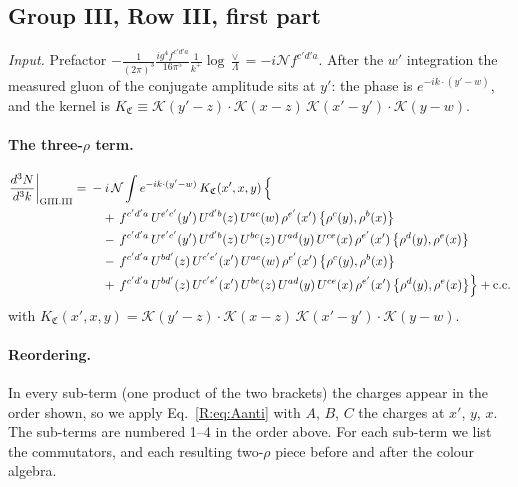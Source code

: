 \documentclass[10pt]{article}
\numberwithin{equation}{section}
\newcommand{\KK}{\mathcal K}
\newcommand{\NN}{\mathcal N}
\begin{document}
\subsection{Group III, Row III, first part}\label{R:sec:GIII.III}
\emph{Input.} Prefactor $-\frac{1}{(2\pi)^3}\frac{ig^4f^{c'd'a}}{16\pi^5}\frac1{k^+}\log\frac\vee\Lambda=-i\NN f^{c'd'a}$. After the $w'$ integration the measured gluon of the conjugate amplitude sits at $y'$: the phase is $e^{-ik\cdot(y'-w)}$, and the kernel is $K_{\mathfrak C}\equiv\KK(y'-z)\cdot\KK(x-z)\,\KK(x'-y')\cdot\KK(y-w)$.
\paragraph{The three-$\rho$ term.}
\begin{align}
\frac{d^3N}{d^3k}\bigg|_{\rm GIII.III}={}&-i\,\NN\int e^{-ik\cdot(y'-w)}\,K_{\mathfrak C}(x',x,y)\,\Big\{\notag\\
&\quad +\,f^{c'd'a}\,U^{e'c'}(y')\,U^{d'b}(z)\,U^{ac}(w)\,\rho^{e'}(x')\,\big\{\rho^{c}(y),\rho^{b}(x)\big\}\notag\\
&\quad -\,f^{c'd'a}\,U^{e'c'}(y')\,U^{d'b}(z)\,U^{bc}(z)\,U^{ad}(y)\,U^{ce}(x)\,\rho^{e'}(x')\,\big\{\rho^{d}(y),\rho^{e}(x)\big\}\notag\\
&\quad -\,f^{c'd'a}\,U^{bd'}(z)\,U^{c'e'}(x')\,U^{ac}(w)\,\rho^{e'}(x')\,\big\{\rho^{c}(y),\rho^{b}(x)\big\}\notag\\
&\quad +\,f^{c'd'a}\,U^{bd'}(z)\,U^{c'e'}(x')\,U^{bc}(z)\,U^{ad}(y)\,U^{ce}(x)\,\rho^{e'}(x')\,\big\{\rho^{d}(y),\rho^{e}(x)\big\}\Big\}+{\rm c.c.}\label{R:eq:in-GIII.III}
\end{align}
with $K_{\mathfrak C}(x',x,y)=\KK(y'-z)\cdot\KK(x-z)\,\KK(x'-y')\cdot\KK(y-w)$.
\paragraph{Reordering.} In every sub-term (one product of the two brackets) the charges appear in the order shown, so we apply Eq.~\eqref{R:eq:Aanti} with $A$, $B$, $C$ the charges at $x'$, $y$, $x$. The sub-terms are numbered 1--4 in the order above. For each sub-term we list the commutators, and each resulting two-$\rho$ piece before and after the colour algebra.
\end{document}
